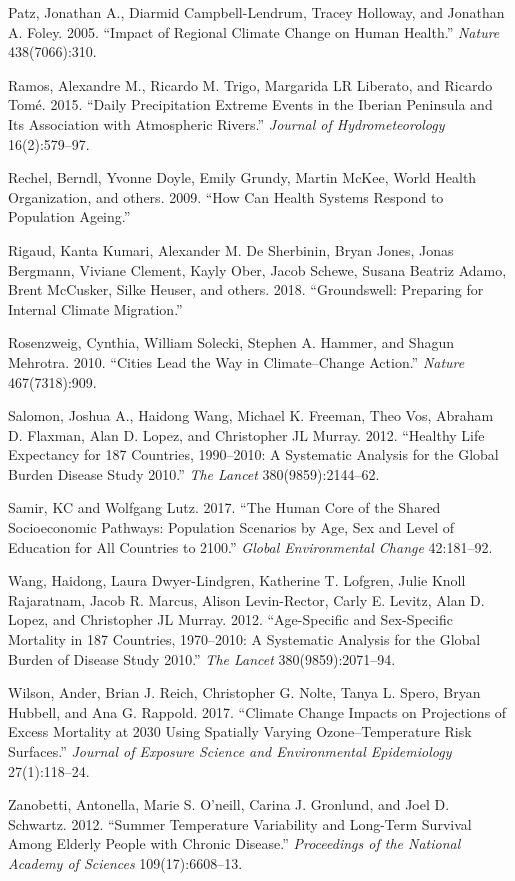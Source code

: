 \documentclass[12pt,]{article}
\begin{document}
\leavevmode\hypertarget{ref-patz2005impact}{}%
Patz, Jonathan A., Diarmid Campbell-Lendrum, Tracey Holloway, and
Jonathan A. Foley. 2005. ``Impact of Regional Climate Change on Human
Health.'' \emph{Nature} 438(7066):310.

\leavevmode\hypertarget{ref-ramos2015daily}{}%
Ramos, Alexandre M., Ricardo M. Trigo, Margarida LR Liberato, and
Ricardo Tomé. 2015. ``Daily Precipitation Extreme Events in the Iberian
Peninsula and Its Association with Atmospheric Rivers.'' \emph{Journal
of Hydrometeorology} 16(2):579--97.

\leavevmode\hypertarget{ref-rechel2009can}{}%
Rechel, Berndl, Yvonne Doyle, Emily Grundy, Martin McKee, World Health
Organization, and others. 2009. ``How Can Health Systems Respond to
Population Ageing.''

\leavevmode\hypertarget{ref-rigaud2018groundswell}{}%
Rigaud, Kanta Kumari, Alexander M. De Sherbinin, Bryan Jones, Jonas
Bergmann, Viviane Clement, Kayly Ober, Jacob Schewe, Susana Beatriz
Adamo, Brent McCusker, Silke Heuser, and others. 2018. ``Groundswell:
Preparing for Internal Climate Migration.''

\leavevmode\hypertarget{ref-rosenzweig2010cities}{}%
Rosenzweig, Cynthia, William Solecki, Stephen A. Hammer, and Shagun
Mehrotra. 2010. ``Cities Lead the Way in Climate--Change Action.''
\emph{Nature} 467(7318):909.

\leavevmode\hypertarget{ref-salomon2012healthy}{}%
Salomon, Joshua A., Haidong Wang, Michael K. Freeman, Theo Vos, Abraham
D. Flaxman, Alan D. Lopez, and Christopher JL Murray. 2012. ``Healthy
Life Expectancy for 187 Countries, 1990--2010: A Systematic Analysis for
the Global Burden Disease Study 2010.'' \emph{The Lancet}
380(9859):2144--62.

\leavevmode\hypertarget{ref-samir2017human}{}%
Samir, KC and Wolfgang Lutz. 2017. ``The Human Core of the Shared
Socioeconomic Pathways: Population Scenarios by Age, Sex and Level of
Education for All Countries to 2100.'' \emph{Global Environmental
Change} 42:181--92.

\leavevmode\hypertarget{ref-wang2012age}{}%
Wang, Haidong, Laura Dwyer-Lindgren, Katherine T. Lofgren, Julie Knoll
Rajaratnam, Jacob R. Marcus, Alison Levin-Rector, Carly E. Levitz, Alan
D. Lopez, and Christopher JL Murray. 2012. ``Age-Specific and
Sex-Specific Mortality in 187 Countries, 1970--2010: A Systematic
Analysis for the Global Burden of Disease Study 2010.'' \emph{The
Lancet} 380(9859):2071--94.

\leavevmode\hypertarget{ref-wilson2017climate}{}%
Wilson, Ander, Brian J. Reich, Christopher G. Nolte, Tanya L. Spero,
Bryan Hubbell, and Ana G. Rappold. 2017. ``Climate Change Impacts on
Projections of Excess Mortality at 2030 Using Spatially Varying
Ozone--Temperature Risk Surfaces.'' \emph{Journal of Exposure Science
and Environmental Epidemiology} 27(1):118--24.

\leavevmode\hypertarget{ref-zanobetti2012summer}{}%
Zanobetti, Antonella, Marie S. O'neill, Carina J. Gronlund, and Joel D.
Schwartz. 2012. ``Summer Temperature Variability and Long-Term Survival
Among Elderly People with Chronic Disease.'' \emph{Proceedings of the
National Academy of Sciences} 109(17):6608--13.
\newpage
\singlespacing 
\end{document}
